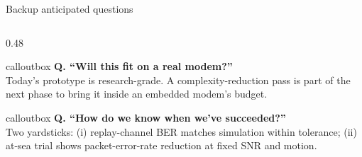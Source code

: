 \documentclass[aspectratio=169,10pt]{beamer}
\begin{document}
\begin{frame}{Backup \textendash{} anticipated questions}
\begin{columns}[T,onlytextwidth]
\begin{column}{0.48\textwidth}
      \begin{beamercolorbox}[wd=\linewidth,sep=6pt,rounded=true]{calloutbox}
        \textbf{Q. ``Will this fit on a real modem?''}\\
        Today's prototype is research-grade. A complexity-reduction pass is part of the next phase to bring it inside an embedded modem's budget.
      \end{beamercolorbox}
      \vspace{0.3em}
      \begin{beamercolorbox}[wd=\linewidth,sep=6pt,rounded=true]{calloutbox}
        \textbf{Q. ``How do we know when we've succeeded?''}\\
        Two yardsticks: (i) replay-channel BER matches simulation within tolerance; (ii) at-sea trial shows packet-error-rate reduction at fixed SNR and motion.
      \end{beamercolorbox}
    \end{column}
  \end{columns}
\end{frame}
\end{document}
